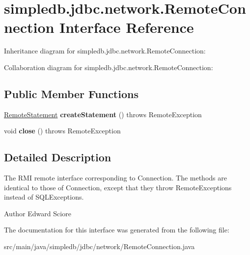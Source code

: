 \hypertarget{interfacesimpledb_1_1jdbc_1_1network_1_1RemoteConnection}{}\section{simpledb.\+jdbc.\+network.\+Remote\+Connection Interface Reference}
\label{interfacesimpledb_1_1jdbc_1_1network_1_1RemoteConnection}


Inheritance diagram for simpledb.\+jdbc.\+network.\+Remote\+Connection\+:


Collaboration diagram for simpledb.\+jdbc.\+network.\+Remote\+Connection\+:
\subsection*{Public Member Functions}
\begin{DoxyCompactItemize}
\item 
\mbox{\label{interfacesimpledb_1_1jdbc_1_1network_1_1RemoteConnection_a985b2f7dbfd0e12dad5120421e2d664f}} 
\hyperlink{interfacesimpledb_1_1jdbc_1_1network_1_1RemoteStatement}{Remote\+Statement} {\bfseries create\+Statement} ()  throws Remote\+Exception
\item 
\mbox{\label{interfacesimpledb_1_1jdbc_1_1network_1_1RemoteConnection_a5029c38548be37a989e7689e9168aab1}} 
void {\bfseries close} ()  throws Remote\+Exception
\end{DoxyCompactItemize}


\subsection{Detailed Description}
The R\+MI remote interface corresponding to Connection. The methods are identical to those of Connection, except that they throw Remote\+Exceptions instead of S\+Q\+L\+Exceptions. \begin{DoxyAuthor}{Author}
Edward Sciore 
\end{DoxyAuthor}


The documentation for this interface was generated from the following file\+:\begin{DoxyCompactItemize}
\item 
src/main/java/simpledb/jdbc/network/Remote\+Connection.\+java\end{DoxyCompactItemize}
